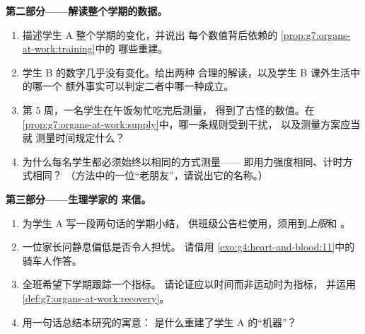 \begin{problem}
\medskip\noindent\textbf{第二部分——解读整个学期的数据。}
\begin{enumerate}[resume]
  \item 描述学生 A 整个学期的变化，并说出
        每个数值背后依赖的
        \cref{prop:g7:organs-at-work:training}中的
        哪些重建。
  \item 学生 B 的数字几乎没有变化。给出两种
        合理的解读，以及学生 B 课外生活中的哪一个
        额外事实可以判定二者中哪一种成立。
  \item 第 5 周，一名学生在午饭匆忙吃完后测量，
        得到了古怪的数值。在
        \cref{prop:g7:organs-at-work:supply}中，哪一条规则受到干扰，
        以及测量方案应当就
        测量时间规定什么？
  \item 为什么每名学生都必须始终以相同的方式测量——
        即用力强度相同、计时方式相同？
        （方法中的一位“老朋友”，请说出它的名称。）
\end{enumerate}

\medskip\noindent\textbf{第三部分——生理学家的
来信。}
\begin{enumerate}[resume]
  \item 为学生 A 写一段两句话的学期小结，
        供班级公告栏使用，须用到\emph{上限}和
        \emph{}。
  \item 一位家长问静息偏低是否令人担忧。
        请借用
        \cref{exo:g4:heart-and-blood:11}中的骑车人作答。
  \item 全班希望下学期跟踪一个指标。
        请论证应以时间而非运动时为指标，
        并运用\cref{def:g7:organs-at-work:recovery}。
  \item 用一句话总结本研究的寓意：
        是什么重建了学生 A 的“机器”？
\end{enumerate}
\end{problem}
